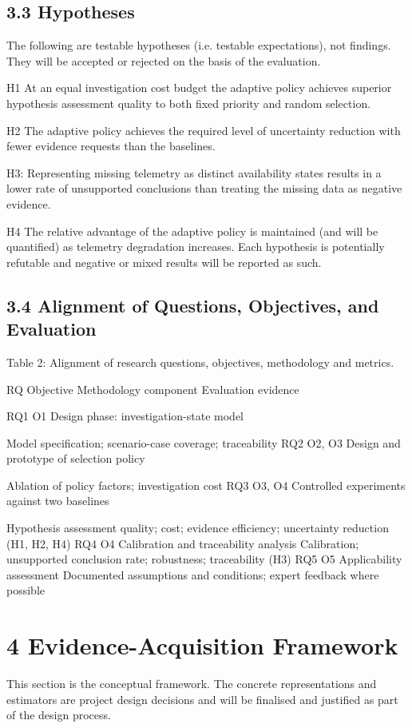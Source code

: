 \documentclass[a4paper,11pt]{article}
\begin{document}
\subsection{3.3 Hypotheses}
The following are testable hypotheses (i.e. testable expectations), not findings. They will be accepted or rejected on the basis of the evaluation.\par
H1 At an equal investigation cost budget the adaptive policy achieves superior hypothesis assessment quality to both fixed priority and random selection.\par
H2 The adaptive policy achieves the required level of uncertainty reduction with fewer evidence requests than the baselines.\par
H3: Representing missing telemetry as distinct availability states results in a lower rate of unsupported conclusions than treating the missing data as negative evidence.\par
H4 The relative advantage of the adaptive policy is maintained (and will be quantified) as telemetry degradation increases. Each hypothesis is potentially refutable and negative or mixed results will be reported as such.\par
\subsection{3.4 Alignment of Questions, Objectives, and Evaluation}
Table 2: Alignment of research questions, objectives, methodology and metrics.\par
RQ Objective Methodology component Evaluation evidence\par
RQ1 O1 Design phase: investigation-state model\par
Model specification; scenario-case coverage; traceability RQ2 O2, O3 Design and prototype of selection policy\par
Ablation of policy factors; investigation cost RQ3 O3, O4 Controlled experiments against two baselines\par
Hypothesis assessment quality; cost; evidence efficiency; uncertainty reduction (H1, H2, H4) RQ4 O4 Calibration and traceability analysis Calibration; unsupported conclusion rate; robustness; traceability (H3) RQ5 O5 Applicability assessment Documented assumptions and conditions; expert feedback where possible\par
\section{4 Evidence-Acquisition Framework}
This section is the conceptual framework. The concrete representations and estimators are project design decisions and will be finalised and justified as part of the design process.\par
\end{document}
